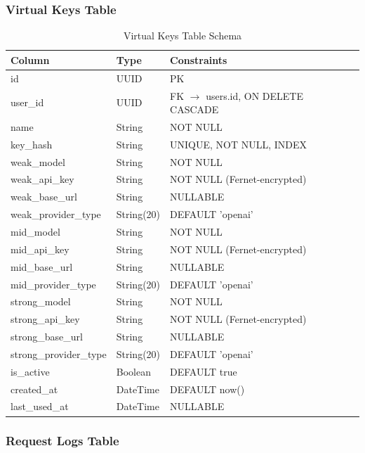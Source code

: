 \documentclass[12pt,a4paper]{report}
\begin{document}
\subsubsection{Virtual Keys Table}

\begin{table}[H]
    \centering
    \caption{Virtual Keys Table Schema}
    \label{tab:keys}
    \begin{tabularx}{\textwidth}{l l X}
    \toprule
    \textbf{Column} & \textbf{Type} & \textbf{Constraints} \\
    \midrule
    id & UUID & PK \\
    user\_id & UUID & FK $\rightarrow$ users.id, ON DELETE CASCADE \\
    name & String & NOT NULL \\
    key\_hash & String & UNIQUE, NOT NULL, INDEX \\
    weak\_model & String & NOT NULL \\
    weak\_api\_key & String & NOT NULL (Fernet-encrypted) \\
    weak\_base\_url & String & NULLABLE \\
    weak\_provider\_type & String(20) & DEFAULT 'openai' \\
    mid\_model & String & NOT NULL \\
    mid\_api\_key & String & NOT NULL (Fernet-encrypted) \\
    mid\_base\_url & String & NULLABLE \\
    mid\_provider\_type & String(20) & DEFAULT 'openai' \\
    strong\_model & String & NOT NULL \\
    strong\_api\_key & String & NOT NULL (Fernet-encrypted) \\
    strong\_base\_url & String & NULLABLE \\
    strong\_provider\_type & String(20) & DEFAULT 'openai' \\
    is\_active & Boolean & DEFAULT true \\
    created\_at & DateTime & DEFAULT now() \\
    last\_used\_at & DateTime & NULLABLE \\
    \bottomrule
    \end{tabularx}
\end{table}

\subsubsection{Request Logs Table}
\end{document}
